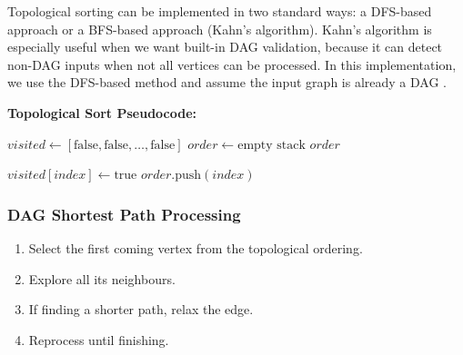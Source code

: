 Topological sorting can be implemented in two standard ways: a DFS-based approach or a BFS-based approach (Kahn's algorithm). Kahn's algorithm is especially useful when we want built-in DAG validation, because it can detect non-DAG inputs when not all vertices can be processed. In this implementation, we use the DFS-based method and assume the input graph is already a DAG \cite{cormen2022introduction}.

\textbf{Topological Sort Pseudocode:}
\begin{algorithm}[H]
\caption{Topological Sort}
\begin{algorithmic}[1]
    \State $visited \gets [\text{false}, \text{false}, \dots , \text{false}]$ 
    \State $order \gets \text{empty stack}$
            \State {}
        \EndIf
    \EndFor
    \State \Return $order$
\EndFunction

    \State $visited[index] \gets \text{true}$
            \State {}
        \EndIf
    \EndFor
    \State $order.\text{push}(index)$
\EndFunction
\end{algorithmic}
\end{algorithm}

\subsubsection{DAG Shortest Path Processing}
\begin{enumerate}
    \item Select the first coming vertex from the topological ordering.
    \item Explore all its neighbours.
    \item If finding a shorter path, relax the edge.
    \item Reprocess until finishing.
\end{enumerate}
